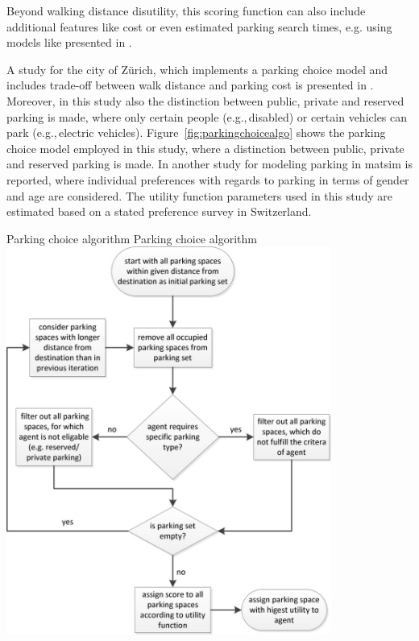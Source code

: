 Beyond walking distance disutility, this scoring function can also include additional features like cost or even estimated parking search times, e.g. using models like presented in \citet[][]{HorniEtAl_IATBRspec_2013}.

A study for the city of Zürich, which implements a parking choice model and includes trade-off between walk distance and parking cost is presented in \citet[][]{WaraichAxhausen_TRR_2012}. Moreover, in this study also the distinction between public, private and reserved parking is made, where only certain people (e.g.,\,disabled) or certain vehicles can park (e.g.,\,electric vehicles). Figure~\ref{fig:parkingchoicealgo} shows the parking choice model employed in this study, where a distinction between public, private and reserved parking is made. In \citet[][]{WaraichEtAl_unpub_TRB_2013} another study for modeling parking in \gls{matsim} is reported, where individual preferences with regards to parking in terms of gender and age are considered. The utility function parameters used in this study are estimated based on a stated preference survey in Switzerland.

\createfigure%
{Parking choice algorithm}%
{Parking choice algorithm}%
{\label{fig:parkingchoicealgo}}%
{\includegraphics[width=0.8\textwidth, angle=0]{extending/figures/Parking/parking_algo.png}}%
{\citet[][]{WaraichAxhausen_TRR_2012}}

